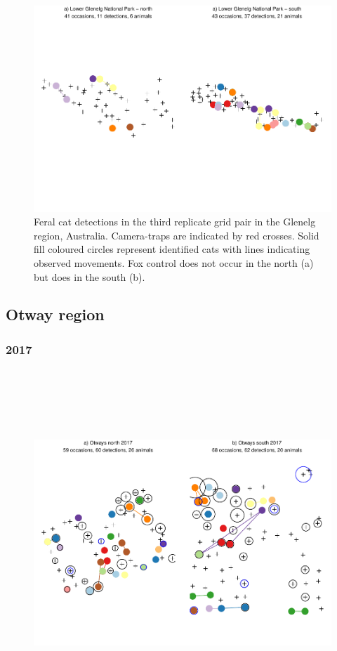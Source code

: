 \documentclass[11pt,a4paper,titlepage,twoside,openright]{style/unimelbthesis}
\begin{document}
\begin{mainmatter}
\begin{figure}
{\centering \includegraphics[width=1\linewidth]{figure/density-plot-ch-3-1} 

}

\caption{Feral cat detections in the third replicate grid pair in the Glenelg region, Australia. Camera-traps are indicated by red crosses. Solid fill coloured circles represent identified cats with lines indicating observed movements. Fox control does not occur in the north (a) but does in the south (b).}\label{fig:density-plot-ch-3}
\end{figure}
\newpage

\hypertarget{otway-region}{%
\subsection{Otway region}\label{otway-region}}

\hypertarget{section}{%
\subsubsection{2017}\label{section}}

\(~\)

\(~\)

\(~\)
\begin{figure}

{\centering \includegraphics[width=1\linewidth]{figure/density-plot-ch-4-1} 

}
\end{figure}
\end{mainmatter}
\end{document}

